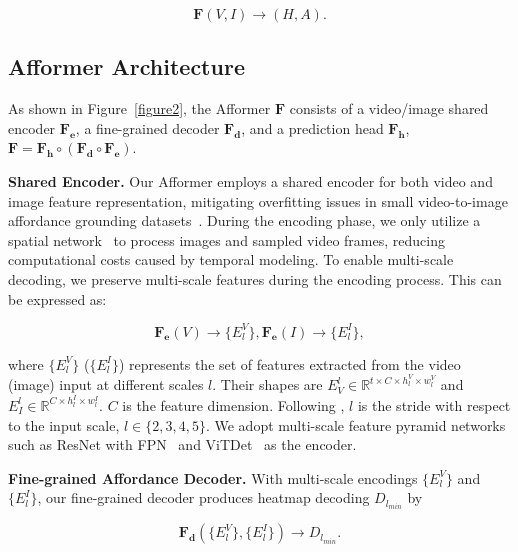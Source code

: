 \documentclass[10pt,twocolumn,letterpaper]{article}
\begin{document}
\begin{equation}
\boldsymbol{F}(V, I) \rightarrow (H, A). \label{equation1}
\end{equation}

\subsection{Afformer Architecture}

As shown in Figure~\ref{figure2}, the Afformer $\boldsymbol{F}$ consists of a video/image shared encoder $\boldsymbol{F_e}$, a fine-grained decoder $\boldsymbol{F_d}$, and a prediction head $\boldsymbol{F_h}$, \ie $\boldsymbol{F} = \boldsymbol{F_h} \circ (\boldsymbol{F_d} \circ \boldsymbol{F_e})$. 

\noindent\textbf{Shared Encoder.} Our Afformer employs a shared encoder for both video and image feature representation, mitigating overfitting issues in small video-to-image affordance grounding datasets~\cite{demo2vec,hotspot,assistq}. During the encoding phase, we only utilize a spatial network~\cite{resnet,vit} to process images and sampled video frames, reducing computational costs caused by temporal modeling. To enable multi-scale decoding, we preserve multi-scale features during the encoding process. This can be expressed as:

\begin{equation}
\boldsymbol{F_e}(V) \rightarrow \{E_l^V\}, \boldsymbol{F_e}(I) \rightarrow \{E_l^I\}, \label{equation2}
\end{equation}

\noindent where $\{E_l^V\}$ ($\{E_l^I\}$) represents the set of features extracted from the video (image) input at different scales $l$. Their shapes are  $E^l_V \in \mathbb{R}^{t\times C\times h_l^V \times w_l^V}$ and $E^l_I \in \mathbb{R}^{C\times h_l^I \times w_l^I}$. $C$ is the feature dimension. Following \cite{fpn}, $l$ is the stride with respect to the input scale, \eg $l \in \{2,3,4,5\}$. We adopt multi-scale feature pyramid networks such as ResNet with FPN~\cite{resnet,fpn} and ViTDet~\cite{vit,vitdet} as the encoder.

\noindent\textbf{Fine-grained Affordance Decoder.}
With multi-scale encodings $\{E_l^V\}$ and $\{E_l^I\}$, our fine-grained decoder produces heatmap decoding $D_{l_{min}}$ by

\begin{equation}
    \boldsymbol{F_d}(\{E_l^V\}, \{E_l^I\}) \rightarrow D_{l_{min}}. \label{equation3}
\end{equation}
\end{document}
